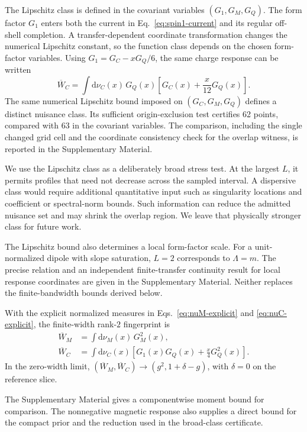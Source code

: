\documentclass[12pt]{iopjournal}
\newcommand{\dd}{\mathrm d}
\theoremstyle{definition}
\theoremstyle{remark}
\begin{document}
The Lipschitz class is defined in the covariant variables $(G_1,G_M,G_Q)$. The form factor $G_1$ enters both the current in Eq.~\eqref{eq:spin1-current} and its regular off-shell completion. A transfer-dependent coordinate transformation changes the numerical Lipschitz constant, so the function class depends on the chosen form-factor variables. Using $G_1=G_C-xG_Q/6$, the same charge response can be written
\begin{equation}
\overline W_C=\int\dd\nu_C(x)\,
G_Q(x)\left[G_C(x)+\frac{x}{12}G_Q(x)\right].
\label{eq:finite-C-Sachs}
\end{equation}
The same numerical Lipschitz bound imposed on $(G_C,G_M,G_Q)$ defines a distinct nuisance class. Its sufficient origin-exclusion test certifies 62 points, compared with 63 in the covariant variables. The comparison, including the single changed grid cell and the coordinate consistency check for the overlap witness, is reported in the Supplementary Material.

We use the Lipschitz class as a deliberately broad stress test. At the largest $L$, it permits profiles that need not decrease across the sampled interval. A dispersive class would require additional quantitative input such as singularity locations and coefficient or spectral-norm bounds. Such information can reduce the admitted nuisance set and may shrink the overlap region. We leave that physically stronger class for future work.

The Lipschitz bound also determines a local form-factor scale. For a unit-normalized dipole with slope saturation, $L=2$ corresponds to $\Lambda=m$. The precise relation and an independent finite-transfer continuity result for local response coordinates are given in the Supplementary Material. Neither replaces the finite-bandwidth bounds derived below.

With the explicit normalized measures in Eqs.~\eqref{eq:nuM-explicit} and \eqref{eq:nuC-explicit}, the finite-width rank-$2$ fingerprint is
\begin{align}
\overline W_M
&=\int \dd\nu_M(x)\,G_M^2(x),
\label{eq:finite-M}\\
\overline W_C
&=\int \dd\nu_C(x)
\left[G_1(x)G_Q(x)+\frac{x}{4}G_Q^2(x)\right].
\label{eq:finite-C}
\end{align}
In the zero-width limit, $(\overline W_M,\overline W_C)\rightarrow(g^2,1+\delta-g)$, with $\delta=0$ on the reference slice.

The Supplementary Material gives a componentwise moment bound for comparison. The nonnegative magnetic response also supplies a direct bound for the compact prior and the reduction used in the broad-class certificate.
\end{document}
